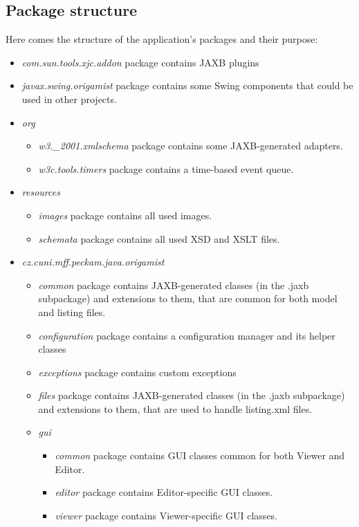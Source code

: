 \subsection{Package structure}
Here comes the structure of the application's packages and their purpose:
\begin{itemize}
\item \emph{com.sun.tools.xjc.addon} package contains JAXB plugins
\item \emph{javax.swing.origamist} package contains some Swing components that could be used in other projects.
\item \emph{org}
	\begin{itemize}
	\item \emph{w3.\_2001.xmlschema} package contains some JAXB-generated adapters.
	\item \emph{w3c.tools.timers} package contains a time-based event queue.
	\end{itemize}
\item \emph{resources}
	\begin{itemize}
	\item \emph{images} package contains all used images.
	\item \emph{schemata} package contains all used XSD and XSLT files.
	\end{itemize}
\item \emph{cz.cuni.mff.peckam.java.origamist}
	\begin{itemize}
	\item \emph{common} package contains JAXB-generated classes (in the .jaxb subpackage) and extensions to them, that are common for both model and listing files.
	\item \emph{configuration} package contains a configuration manager and its helper classes
	\item \emph{exceptions} package contains custom exceptions
	\item \emph{files} package contains JAXB-generated classes (in the .jaxb subpackage) and extensions to them, that are used to handle listing.xml files.
	\item \emph{gui}
	\begin{itemize}
		\item \emph{common} package contains GUI classes common for both Viewer and Editor.
		\item \emph{editor} package contains Editor-specific GUI classes.
		\item \emph{viewer} package contains Viewer-specific GUI classes.
	\end{itemize}

\end{itemize}
\end{itemize}
